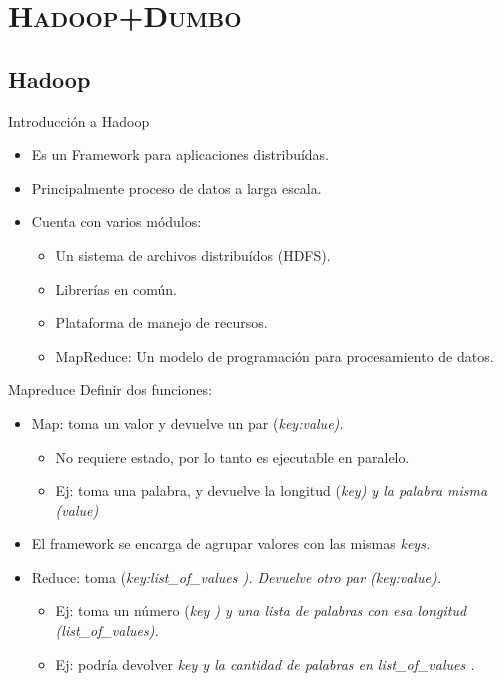 \documentclass[xcolor=x11names,compress]{beamer}
\renewcommand{\(}{\begin{columns}}
\renewcommand{\)}{\end{columns}}
\newcommand{\<}[1]{\begin{column}{#1}}
\renewcommand{\>}{\end{column}}
\begin{document}
\section{\scshape Hadoop+Dumbo}
\subsection{Hadoop}
\begin{frame}{Introducción a Hadoop}
\begin{itemize}
\item Es un Framework para aplicaciones distribuídas.
\item Principalmente proceso de datos a larga escala.
\item Cuenta con varios módulos:
\begin{itemize}
\item Un sistema de archivos distribuídos (HDFS).
\item Librerías en común.
\item Plataforma de manejo de recursos.
\item MapReduce: Un modelo de programación para procesamiento de datos.
\end{itemize}
\end{itemize}
\end{frame}

\begin{frame}{Mapreduce}
Definir dos funciones:
\begin{itemize}
\item Map: toma un valor y devuelve un par (\em key:value\em).
\begin{itemize}
\item No requiere estado, por lo tanto es ejecutable en paralelo.
\item Ej: toma una palabra, y devuelve la longitud (\em key\em) y la palabra misma (\em value\em)
\end{itemize}
\item El framework se encarga de agrupar valores con las mismas \em keys\em.
\item Reduce: toma (\em key:list\_of\_values \em). Devuelve otro par (\em key:value\em).
\begin{itemize}
\item Ej: toma un número (\em key \em) y una lista de palabras con esa longitud (\em list\_of\_values\em).
\item Ej: podría devolver \em key \em y la cantidad de palabras en \em list\_of\_values \em.
\end{itemize}
\end{itemize}
\end{frame}
\end{document}
